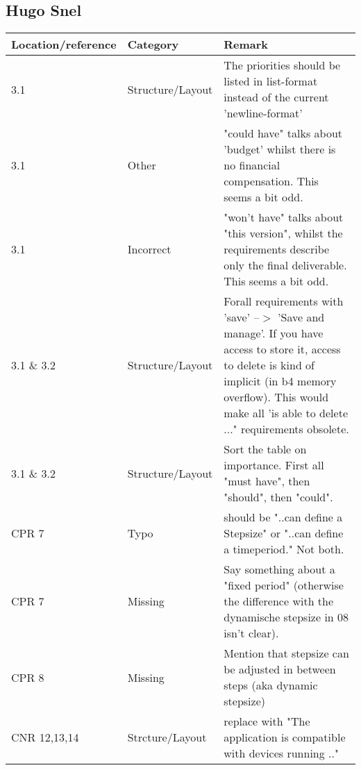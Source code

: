 \subsection*{Hugo Snel}

\begin{tabular}{l|l|p{}}
Location/reference & Category & Remark\\
\hline
\hline
3.1 & Structure/Layout & The priorities should be listed in list-format instead of the current 'newline-format'\\
3.1 & Other & "could have" talks about 'budget' whilst there is no financial compensation. This seems a bit odd.\\
3.1 & Incorrect & "won't have" talks about "this version", whilst the requirements describe only the final deliverable. This seems a bit odd.\\
3.1 \& 3.2 & Structure/Layout & Forall requirements with 'save' --$>$ 'Save and manage'. If you have access to store it, access to delete is kind of implicit (in b4 memory overflow). This would make all 'is able to delete ..." requirements obsolete.\\
3.1 \& 3.2 & Structure/Layout & Sort the table on importance. First all "must have", then "should", then "could".\\
CPR 7 & Typo & should be "..can define a Stepsize" 	or	"..can define a timeperiod."	Not both.\\
CPR 7 & Missing &  Say something about a "fixed period" (otherwise the difference with the dynamische stepsize in 08 isn't clear).\\
CPR 8 & Missing & Mention that stepsize can be adjusted in between steps (aka dynamic stepsize)\\
CNR 12,13,14 & Strcture/Layout & replace with "The application is compatible with devices running .."\\

\end{tabular}